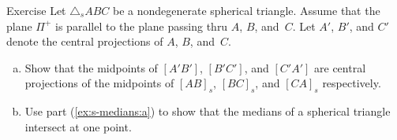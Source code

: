 \begin{thm}{Exercise}\label{ex:s-medians}
Let $\triangle_sABC$ be a nondegenerate spherical triangle.
Assume that the plane $\Pi^+$ is parallel to the plane passing thru $A$, $B$, and~$C$.
Let $A'$, $B'$, and $C'$ denote the central projections of $A$, $B$, and~$C$.
\begin{enumerate}[(a)]
\item\label{ex:s-medians:a} Show that the midpoints of $[A'B']$, $[B'C']$, and $[C'A']$
are central projections of the midpoints of $[AB]_s$, $[BC]_s$, and $[CA]_s$ respectively.
\item\label{ex:s-medians:b} Use part (\ref{ex:s-medians:a}) to show that the medians of a spherical triangle intersect at one point.
\end{enumerate}

\end{thm}

